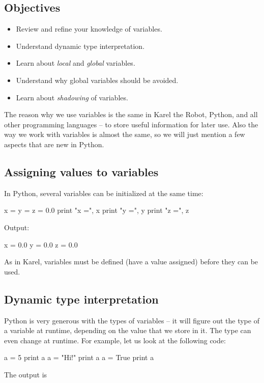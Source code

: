 \subsection{Objectives}

\begin{itemize}
\item Review and refine your knowledge of variables.
\item Understand dynamic type interpretation.
\item Learn about {\em local} and {\em global} variables.
\item Understand why global variables should be avoided.
\item Learn about {\em shadowing} of variables.
\end{itemize}
The reason why we use variables is the same in Karel the Robot, Python, and all other programming 
languages -- to store useful information for later use. Also the way we work with variables is almost the 
same, so we will just mention a few aspects that are new in Python.

\subsection{Assigning values to variables}

In Python, several variables can be initialized at the same time:

\begin{bluecode}
x = y = z = 0.0
print "x =", x
print "y =", y
print "z =", z
\end{bluecode}
Output:

\begin{bluecode}
x = 0.0
y = 0.0
z = 0.0
\end{bluecode}
As in Karel, variables must be defined (have a value assigned) before they can be 
used. 

\subsection{Dynamic type interpretation}

Python is very generous with the types of variables -- it will figure out the type of a variable 
at runtime, depending on the value that we store in it. The type can even change at runtime.
For example, let us look at the following code:

\begin{bluecode}
a = 5
print a
a = "Hi!"
print a
a = True
print a
\end{bluecode}
The output is 

